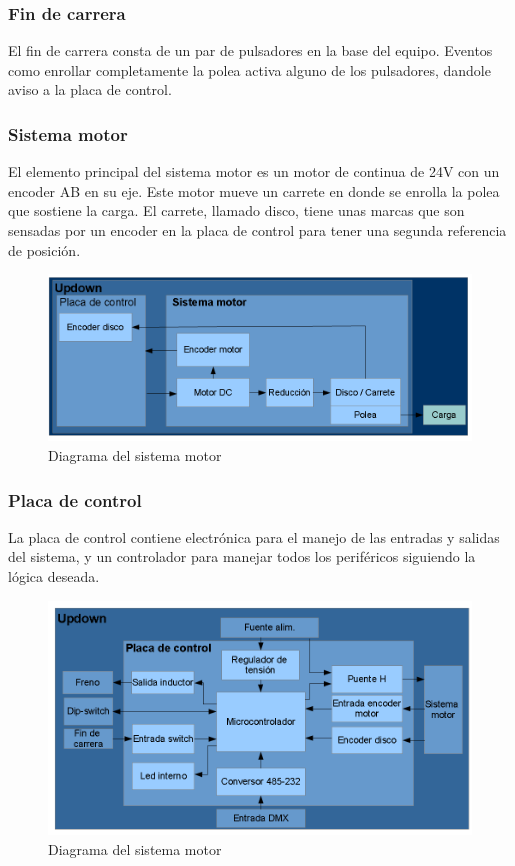 \subsubsection{Fin de carrera}
El fin de carrera consta de un par de pulsadores en la base del equipo. Eventos como enrollar completamente la polea activa alguno de los pulsadores, dandole aviso a la placa de control.

\subsubsection{Sistema motor}
El elemento principal del sistema motor es un motor de continua de 24V con un encoder AB en su eje. Este motor mueve un carrete en donde se enrolla la polea que sostiene la carga. El carrete, llamado disco, tiene unas marcas que son sensadas por un encoder en la placa de control para tener una segunda referencia de posición.

\begin{figure}[!ht]
	\centering
	\includegraphics[width=15cm,scale=1]{resources/1_11-diagramaSistemaMotor.png}
	\caption{Diagrama del sistema motor}
	\label{fig:\thefigure}
\end{figure}

\subsubsection{Placa de control}
La placa de control contiene electrónica para el manejo de las entradas y salidas del sistema, y un controlador para manejar todos los periféricos siguiendo la lógica deseada.\\

\begin{figure}[!ht]
	\centering
	\includegraphics[width=15cm,scale=1]{resources/1_12-diagramaPlacaControl.png}
	\caption{Diagrama del sistema motor}
	\label{fig:\thefigure}
\end{figure}


